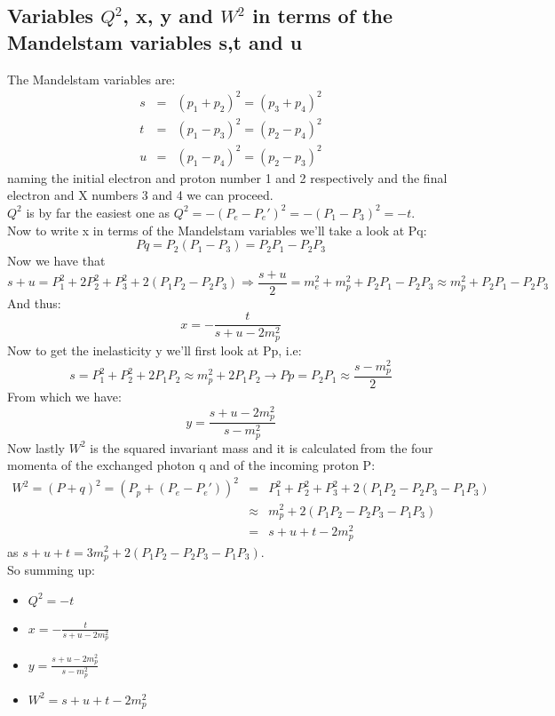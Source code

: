 \documentclass[10pt,a4paper,twoside]{article}
\begin{document}
\subsection{Variables $Q^2$, x, y and $W^2$ in terms of the Mandelstam variables s,t and u}
The Mandelstam variables are\cite{Thomson}:
\begin{eqnarray}
	s &=& (p_1 + p_2)^2 = (p_3 + p_4)^2\\
	t &=& (p_1 - p_3)^2 = (p_2-p_4)^2\\
	u &=& (p_1 - p_4)^2 = (p_2 - p_3)^2
\end{eqnarray}
naming the initial electron and proton number 1 and 2 respectively and the final electron and X numbers 3 and 4 we can proceed.\\
$Q^2$ is by far the easiest one as $Q^2 = -(P_e-P_e')^2 = -(P_1-P_3)^2 = -t$.\\
Now to write x in terms of the Mandelstam variables we'll take a look at Pq:
\begin{equation}
	Pq = P_2(P_1-P_3) = P_2P_1 - P_2P_3
\end{equation}
Now we have that
\begin{equation}
	s + u = P_1^2 + 2P_2^2 + P_3^2 + 2(P_1P_2 - P_2P_3) \Rightarrow \frac{s + u}{2} = m_e^2 + m_p^2 + P_2P_1 - P_2P_3 \approx m_p^2 + P_2P_1 - P_2P_3
\end{equation}
And thus:
\begin{equation}
	x = -\frac{t}{s+u-2m_p^2}
\end{equation}
Now to get the inelasticity y we'll first look at Pp, i.e:
\begin{equation}
	s = P_1^2 + P_2^2 + 2P_1P_2 \approx m_p^2 + 2P_1P_2 \rightarrow Pp = P_2P_1 \approx \frac{s-m_p^2}{2}
\end{equation}
From which we have:
\begin{equation}
	y = \frac{s+u-2m_p^2}{s-m_p^2}
\end{equation}
Now lastly $W^2$ is the squared invariant mass and it is calculated from the four momenta of the exchanged photon q and of the incoming proton P:
\begin{eqnarray}
	W^2 = (P + q)^2 = (P_p + (P_e - P_e'))^2 &=& P_1^2 + P_2^2 + P_3^2 + 2(P_1P_2 - P_2P_3 - P_1P_3)\\
	&\approx& m_p^2 + 2(P_1P_2 - P_2P_3 - P_1P_3)\\
	&=& s+u+t - 2m_p^2
\end{eqnarray}
as $s+u+t = 3m_p^2 + 2(P_1P_2 - P_2P_3 - P_1P_3)$.\\
So summing up:
\begin{itemize}
	\item $Q^2 = -t$
	\item $x = -\frac{t}{s+u-2m_p^2}$
	\item $y = \frac{s+u-2m_p^2}{s-m_p^2}$
	\item $W^2 = s+u+t - 2m_p^2$
\end{itemize}
\end{document}
